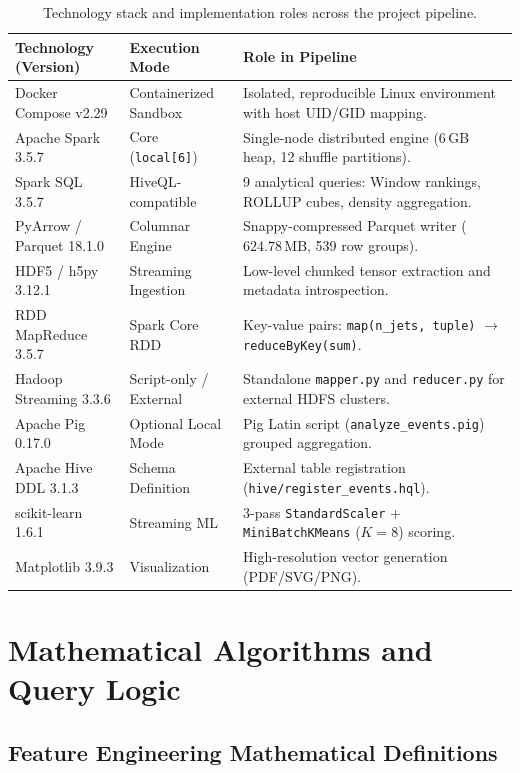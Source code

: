 \documentclass[11pt,a4paper]{article}
\begin{document}
\begin{table}[H]
\centering
\small
\begin{tabularx}{\textwidth}{llX}
\toprule
\textbf{Technology (Version)} & \textbf{Execution Mode} & \textbf{Role in Pipeline} \\
\midrule
Docker Compose v2.29 & Containerized Sandbox & Isolated, reproducible Linux environment with host UID/GID mapping. \\
Apache Spark 3.5.7 & Core (\texttt{local[6]}) & Single-node distributed engine (6\,GB heap, 12 shuffle partitions). \\
Spark SQL 3.5.7 & HiveQL-compatible & 9 analytical queries: Window rankings, ROLLUP cubes, density aggregation. \\
PyArrow / Parquet 18.1.0 & Columnar Engine & Snappy-compressed Parquet writer ($624.78\,\text{MB}$, 539 row groups). \\
HDF5 / h5py 3.12.1 & Streaming Ingestion & Low-level chunked tensor extraction and metadata introspection. \\
RDD MapReduce 3.5.7 & Spark Core RDD & Key-value pairs: \texttt{map(n\_jets, tuple)} $\to$ \texttt{reduceByKey(sum)}. \\
Hadoop Streaming 3.3.6 & Script-only / External & Standalone \texttt{mapper.py} and \texttt{reducer.py} for external HDFS clusters. \\
Apache Pig 0.17.0 & Optional Local Mode & Pig Latin script (\texttt{analyze\_events.pig}) grouped aggregation. \\
Apache Hive DDL 3.1.3 & Schema Definition & External table registration (\texttt{hive/register\_events.hql}). \\
scikit-learn 1.6.1 & Streaming ML & 3-pass \texttt{StandardScaler} + \texttt{MiniBatchKMeans} ($K=8$) scoring. \\
Matplotlib 3.9.3 & Visualization & High-resolution vector generation (PDF/SVG/PNG). \\
\bottomrule
\end{tabularx}
\caption{Technology stack and implementation roles across the project pipeline.}
\label{tab:tech_stack}
\end{table}

\section{Mathematical Algorithms and Query Logic}

\subsection{Feature Engineering Mathematical Definitions}
\end{document}
